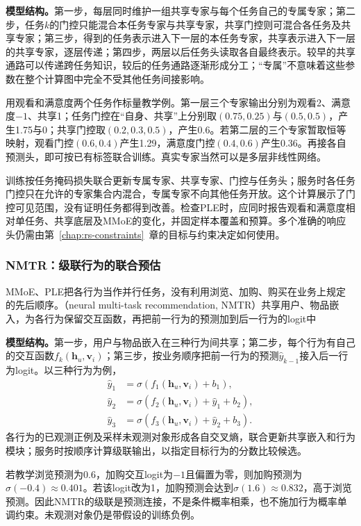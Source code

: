 \textbf{模型结构。}第一步，每层同时维护一组共享专家与每个任务自己的专属专家；第二步，任务$k$的门控只能混合本任务专家与共享专家，共享门控则可混合各任务及共享专家；第三步，得到的任务表示进入下一层的本任务专家，共享表示进入下一层的共享专家，逐层传递；第四步，两层以后任务头读取各自最终表示。较早的共享通路可以传递跨任务知识，较后的任务通路逐渐形成分工；“专属”不意味着这些参数在整个计算图中完全不受其他任务间接影响。

用观看和满意度两个任务作标量教学例。第一层三个专家输出分别为观看2、满意度$-1$、共享1；任务门控在“自身、共享”上分别取$(0.75,0.25)$与$(0.5,0.5)$，产生1.75与0；共享门控取$(0.2,0.3,0.5)$，产生0.6。若第二层的三个专家暂取恒等映射，观看门控$(0.6,0.4)$产生1.29，满意度门控$(0.4,0.6)$产生0.36。再接各自预测头，即可按已有标签联合训练。真实专家当然可以是多层非线性网络。

训练按任务掩码损失联合更新专属专家、共享专家、门控与任务头；服务时各任务门控只在允许的专家集合内混合，专属专家不向其他任务开放。这个计算展示了门控可见范围，没有证明任务都得到改善。检查PLE时，应同时报告观看和满意度相对单任务、共享底层及MMoE的变化，并固定样本覆盖和预算。多个准确的响应头仍需由第~\ref{chap:rs-constraints}~章的目标与约束决定如何使用。

\subsubsection{NMTR：级联行为的联合预估}
\label{sec:rs-nmtr}

MMoE、PLE把各行为当作并行任务，没有利用浏览、加购、购买在业务上规定的先后顺序。（neural multi-task recommendation, NMTR）共享用户、物品嵌入，为各行为保留交互函数，再把前一行为的预测加到后一行为的logit中

\textbf{模型结构。}第一步，用户与物品嵌入在三种行为间共享；第二步，每个行为有自己的交互函数$f_k(\bm h_u,\bm v_i)$；第三步，按业务顺序把前一行为的预测$\widehat y_{k-1}$接入后一行为logit。以三种行为为例，
\begin{align}
 \widehat y_1&=\sigma(f_1(\bm h_u,\bm v_i)+b_1),\\
 \widehat y_2&=\sigma(f_2(\bm h_u,\bm v_i)+\widehat y_1+b_2),\\
 \widehat y_3&=\sigma(f_3(\bm h_u,\bm v_i)+\widehat y_2+b_3).
 \label{eq:rs-nmtr}
\end{align}
各行为的已观测正例及采样未观测对象形成各自交叉熵，联合更新共享嵌入和行为模块；服务时按顺序计算级联输出，以指定目标行为的分数比较候选。

若教学浏览预测为0.6，加购交互logit为$-1$且偏置为零，则加购预测为$\sigma(-0.4)\approx0.401$。若该logit改为1，加购预测会达到$\sigma(1.6)\approx0.832$，高于浏览预测。因此NMTR的级联是预测连接，不是条件概率相乘，也不施加行为概率单调约束。未观测对象仍是带假设的训练负例。

